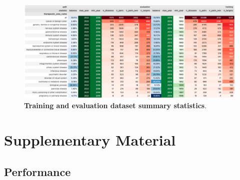 \documentclass{article}
\begin{document}


\begin{figure}[!htb]
  \centering
  \captionsetup{width=.9\linewidth}
  \includegraphics[width=1\textwidth]{dataset_statistics.png}
  \caption{
    \textbf{Training and evaluation dataset summary statistics}.
  }
  \label{fig:dataset_statistics}
\end{figure}


\section{Supplementary Material}

\subsection{Performance}
\end{document}
